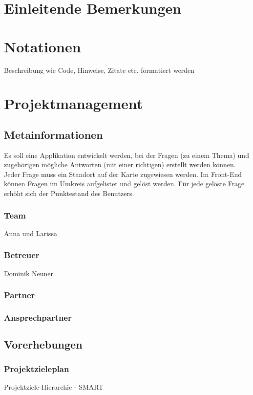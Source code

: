 \def \currentAuthor {Gabi Sorglos} %

\chapter*{Einleitende Bemerkungen}

\chapter*{Notationen}
Beschreibung wie Code, Hinweise, Zitate etc. formatiert werden  

\chapter{Projektmanagement}

\section{Metainformationen}
Es soll eine Applikation entwickelt werden, bei der Fragen (zu einem Thema) und zugehörigen mögliche Antworten (mit einer richtigen) erstellt werden können. Jeder Frage muss ein Standort auf der Karte zugewiesen werden. 
Im Front-End können Fragen im Umkreis aufgelistet und gelöst werden. Für jede gelöste Frage erhöht sich der Punktestand des Benutzers.  

\subsection{Team}
Anna und Larissa 
\subsection{Betreuer}
Dominik Neuner
\subsection{Partner}
\subsection{Ansprechpartner}
\section{Vorerhebungen}
\subsection{Projektzieleplan}
Projektziele-Hierarchie - SMART

